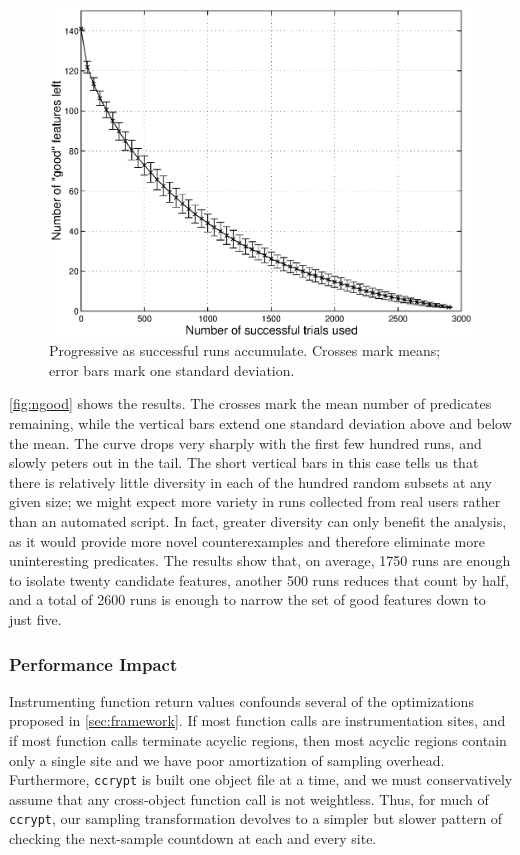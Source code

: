 \begin{figure}
  \centering
  \small
  \includegraphics[width=\columnwidth]{applications/ds1000ngood_plot}
  \caption{Progressive 
    as successful runs accumulate.  Crosses mark means; error bars
    mark one standard deviation.}
  \label{fig:ngood}
\end{figure}

\autoref{fig:ngood} shows the results.  The crosses mark the mean
number of predicates remaining, while the vertical bars extend one
standard deviation above and below the mean.  The curve drops very
sharply with the first few hundred runs, and slowly peters out in the
tail.  The short vertical bars in this case tells us that there is
relatively little diversity in each of the hundred random subsets at
any given size; we might expect more variety in runs collected from
real users rather than an automated script.  In fact, greater
diversity can only benefit the analysis, as it would provide more
novel counterexamples and therefore eliminate more uninteresting
predicates.  The results show that, on average, 1750 runs are enough
to isolate twenty candidate features, another 500 runs reduces that
count by half, and a total of 2600 runs is enough to narrow the set of
good features down to just five.

\subsubsection{Performance Impact}

Instrumenting function return values confounds several of the
optimizations proposed in \autoref{sec:framework}.  If most function
calls are instrumentation sites, and if most function calls terminate
acyclic regions, then most acyclic regions contain only a single site
and we have poor amortization of sampling overhead.  Furthermore,
\texttt{ccrypt} is built one object file at a time, and we must
conservatively assume that any cross-object function call is not
weightless.  Thus, for much of \texttt{ccrypt}, our sampling
transformation devolves to a simpler but slower pattern of checking
the next-sample countdown at each and every site.

